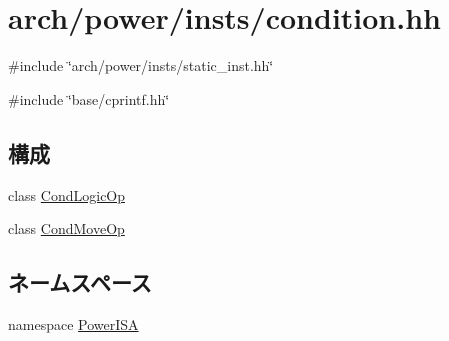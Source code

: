 \hypertarget{condition_8hh}{
\section{arch/power/insts/condition.hh}
\label{condition_8hh}
}
{\ttfamily \#include \char`\"{}arch/power/insts/static\_\-inst.hh\char`\"{}}\par
{\ttfamily \#include \char`\"{}base/cprintf.hh\char`\"{}}\par
\subsection*{構成}
\begin{DoxyCompactItemize}
\item 
class \hyperlink{classPowerISA_1_1CondLogicOp}{CondLogicOp}
\item 
class \hyperlink{classPowerISA_1_1CondMoveOp}{CondMoveOp}
\end{DoxyCompactItemize}
\subsection*{ネームスペース}
\begin{DoxyCompactItemize}
\item 
namespace \hyperlink{namespacePowerISA}{PowerISA}
\end{DoxyCompactItemize}
